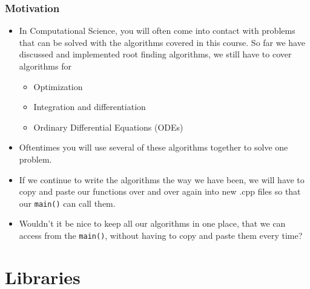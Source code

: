 \documentclass{if-beamer}
\begin{document}
\begin{frame}
	\frametitle{Motivation}
	\begin{itemize}
		\item In Computational Science, you will often come into contact with problems that can be solved with the algorithms covered in this course. So far we have discussed and implemented root finding algorithms, we still have to cover algorithms for \\\vspace{0.2cm}
		\begin{itemize}
			\item Optimization
			\item Integration and differentiation
			\item Ordinary Differential Equations (ODEs) \\\vspace{0.2cm}
		\end{itemize}	
		\item Oftentimes you will use several of these algorithms together to solve one problem. \\\vspace{0.2cm}
		\item If we continue to write the algorithms the way we have been, we will have to copy and paste our functions over and over again into new .cpp files so that our \texttt{main()} can call them. \\\vspace{0.2cm}
		\item Wouldn't it be nice to keep all our algorithms in one place, that we can access from the \texttt{main()}, without having to copy and paste them every time? \\
	\end{itemize}
\end{frame}

\section{Libraries}
\end{document}
